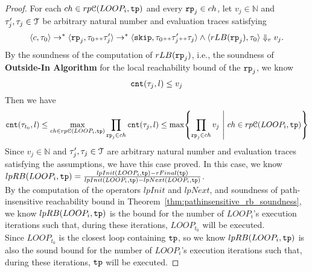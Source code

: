 \begin{proof}
    For each $ch \in rp\mathcal{C}(LOOP_i, \mathtt{tp})$ and 
    every $\mathtt{rp}_j \in ch$, let $ v_j \in \mathbb{N}$  and 
            $\mathtt{\tau}_j', \mathtt{\tau}_j \in \mathcal{T}$ be arbitrary natural number
            and evaluation traces satisfying 
            \[
                \langle  c, \mathtt{\tau}_0 \rangle \to^{*} 
                \langle \mathtt{rp}_j, \mathtt{\tau}_0 {\scriptscriptstyle ++} \mathtt{\tau}_j' \rangle \to^*
                \langle \mathtt{skip}, \mathtt{\tau}_0 {\scriptscriptstyle ++} \mathtt{\tau}_j' {\scriptscriptstyle ++} \mathtt{\tau}_j \rangle
                \land
                 \langle rLB(\mathtt{rp}_j),\mathtt{\tau}_0  \rangle \Downarrow_e v_j.
            \]
        By the soundness of the computation of $rLB(\mathtt{rp}_j)$, 
       i.e., the soundness of \textbf{Outside-In Algorithm} for the local reachability
                  bound of the $\mathtt{rp}_j$, we know 
                  \[
                    \mathtt{cnt}(\mathtt{\tau}_j, l) \leq v_j
                    \]
Then we have 
\[
    \vcounter(\vtrace_{t_0}, l) 
    \leq \max_{ch \in rp\mathcal{C}(LOOP_i, \tpath)} 
    \prod\limits_{\rprog_j \in ch}
    \vcounter(\vtrace_j, l) \leq 
    \max \left\{ \prod\limits_{\rprog_j \in ch}  v_j 
        ~\middle\vert~ ch \in rp\mathcal{C}(LOOP_i, \tpath) \right\}
    \]
Since $ v_j \in \mathbb{N}$  and 
$\mathtt{\tau}_j', \mathtt{\tau}_j \in \mathcal{T}$ are arbitrary natural number
and evaluation traces satisfying the assumptions, we have this case proved.
%
        In this case, we know 
        $lpRB(LOOP_i, \mathtt{tp}) =
        \frac{lpInit(LOOP_i, \mathtt{tp}) - rFinal(\mathtt{tp})}{lpInit(LOOP_i, \mathtt{tp}) - lpNext(LOOP_i, \mathtt{tp})}$.
        \\
        By the computation of the operators $lpInit$ and $lpNext$, and soundness of path-insensitive reachability bound 
        in Theorem~\ref{thm:pathinsensitive_rb_soundness}, 
        we know 
        $lpRB(LOOP_i, \mathtt{tp})$ is the
        bound for the number of $LOOP_i$'s execution iterations
        such that, during these iterations, $LOOP_{t_0}$ will be executed. 
        \\
        Since $LOOP_{t_0}$ is the closest loop containing $\mathtt{tp}$, so we know 
        $lpRB(LOOP_i, \mathtt{tp})$  is also the sound bound for the number of $LOOP_i$'s execution iterations
        such that, during these iterations, $\mathtt{tp}$ will be executed. 

\end{proof}
